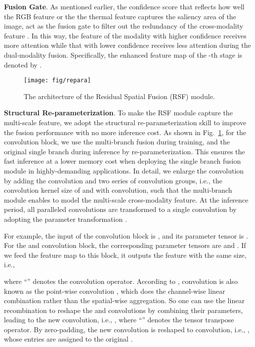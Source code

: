 \documentclass[10.5pt,twocolumn,journal,letterpaper]{IEEEtran}
\newcommand{\ie}{i.e.}
\begin{document}
\textbf{Fusion Gate}. As mentioned earlier, the confidence score  that reflects how well the RGB feature or the the thermal feature captures the saliency area of the image, act as the fusion gate to filter out the redundancy of the cross-modality feature . In this way, the feature of the modality with higher confidence receives more attention while that with lower confidence receives less attention during the dual-modality fusion. Specifically, the enhanced feature map of the -th stage is denoted by .   

\begin{figure}[!t]
	\centering
	\texttt{[image: fig/repara]}
	\caption{The architecture of the Residual Spatial Fusion (RSF) module.}
	\label{fig:repara}
\end{figure}

\textbf{Structural Re-parameterization}. To make the RSF module capture the multi-scale feature, we adopt the structural re-parameterization \cite{ding-cvpr2021-repvgg, ding-cvpr2021-dbb} skill to improve the fusion performance with no more inference cost. As shown in Fig.~\ref{fig:repara}, for the  convolution block, we use the multi-branch fusion during training, and the original single branch during inference by re-parameterization. This ensures the fast inference at a lower memory cost when deploying the single branch fusion module in highly-demanding applications. In detail, we enlarge the  convolution by adding the  convolution and two series of convolution groups, \ie, the convolution kernel size of  and  with  convolution, such that the multi-branch module enables to model the multi-scale cross-modality feature. At the inference period, all paralleled convolutions are transformed to a single  convolution by adopting the parameter transformation \cite{ding-cvpr2021-repvgg}. 

For example, the input of the  convolution block is , and its parameter tensor is . For the  and  convolution block, the corresponding parameter tensors are  and . If we feed the feature map  to this block, it outputs the feature with the same size, \ie, 

where ``'' denotes the convolution operator. According to \cite{ding-cvpr2021-dbb},  convolution is also known as the point-wise convolution \cite{howard-arxiv2017-mobilenets}, which does the channel-wise linear combination rather than the spatial-wise aggregation. So one can use the linear recombination to reshape the  and  convolutions by combining their parameters, leading to the new  convolution, \ie, , where ``'' denotes the tensor transpose operator. By zero-padding, the new convolution is reshaped to  convolution, \ie, , whose entries are assigned to the original . 
\end{document}
